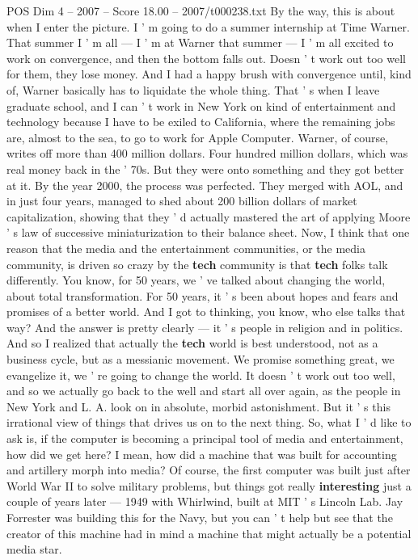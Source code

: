 \begin{textsample}{POS Dim 4 – 2007 – Score 18.00 – 2007/t000238.txt}
By the way, this is about when I enter the picture.
I ' m going to do a summer internship at Time Warner.
That summer I ' m all — I ' m at Warner that summer — I ' m all excited to work on convergence, and then the bottom falls out.
Doesn ' t work out too well for them, they lose money.
And I had a happy brush with convergence until, kind of, Warner basically has to liquidate the whole thing.
That ' s when I leave graduate school, and I can ' t work in New York on kind of entertainment and technology because I have to be exiled to California, where the remaining jobs are, almost to the sea, to go to work for Apple Computer.
Warner, of course, writes off more than 400 million dollars.
Four hundred million dollars, which was real money back in the ' 70s.
But they were onto something and they got better at it.
By the year 2000, the process was perfected.
They merged with AOL, and in just four years, managed to shed about 200 billion dollars of market capitalization, showing that they ' d actually mastered the art of applying Moore ' s law of successive miniaturization to their balance sheet.
Now, I think that one reason that the media and the entertainment communities, or the media community, is driven so crazy by the \textbf{tech} community is that \textbf{tech} folks talk differently.
You know, for 50 years, we ' ve talked about changing the world, about total transformation.
For 50 years, it ' s been about hopes and fears and promises of a better world.
And I got to thinking, you know, who else talks that way?
And the answer is pretty clearly — it ' s people in religion and in politics.
And so I realized that actually the \textbf{tech} world is best understood, not as a business cycle, but as a messianic movement.
We promise something great, we evangelize it, we ' re going to change the world.
It doesn ' t work out too well, and so we actually go back to the well and start all over again, as the people in New York and L.
A. look on in absolute, morbid astonishment.
But it ' s this irrational view of things that drives us on to the next thing.
So, what I ' d like to ask is, if the computer is becoming a principal tool of media and entertainment, how did we get here?
I mean, how did a machine that was built for accounting and artillery morph into media?
Of course, the first computer was built just after World War II to solve military problems, but things got really \textbf{interesting} just a couple of years later — 1949 with Whirlwind, built at MIT ' s Lincoln Lab.
Jay Forrester was building this for the Navy, but you can ' t help but see that the creator of this machine had in mind a machine that might actually be a potential media star.

\end{textsample}
